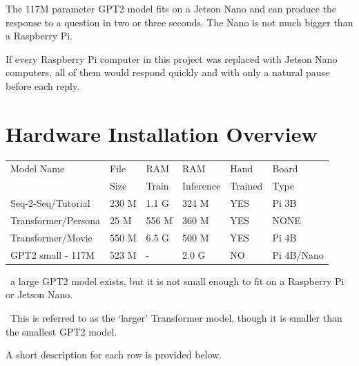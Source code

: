 The 117M parameter GPT2 model fits on a Jetson Nano and can produce the response to a question in two or three seconds. The Nano is not much bigger than a Raspberry Pi.

If every Raspberry Pi computer in this project was replaced with Jetson Nano computers, all of them would respond quickly and with only a natural pause before each reply.

\section{Hardware Installation Overview}



\begin{table}[H]
	
	\begin{center}
		
		
		\begin{tabular}{llllll}
			
			Model Name    & File  & RAM  & RAM    & Hand & Board \\
			&  Size & Train   & Inference    & Trained &   Type \\
			\hline
			\hline
			Seq-2-Seq/Tutorial & 230 M     & 1.1 G & 324 M             & YES  &  Pi 3B \\
			Transformer/Persona   & 25 M      & 556 M & 360 M          & YES  & NONE \\
			Transformer/Movie \dag \dag  & 550 M      & 6.5 G & 500 M  & YES    & Pi 4B  \\
			GPT2 small - 117M \dag   & 523 M  & -   & 2.0 G         & NO     &  Pi 4B/Nano \\
			\hline
		\end{tabular}
		
		\bigskip
	\end{center}
		\dag \ a large GPT2 model exists, but it is not small enough to fit on a Raspberry Pi or Jetson Nano.
		
		\dag \dag \ This is referred to as the `larger' Transformer model, though it is smaller than the smallest GPT2 model.
		
	
	\label{fig:modeloverview}
\end{table}


A short description for each row is provided below.

